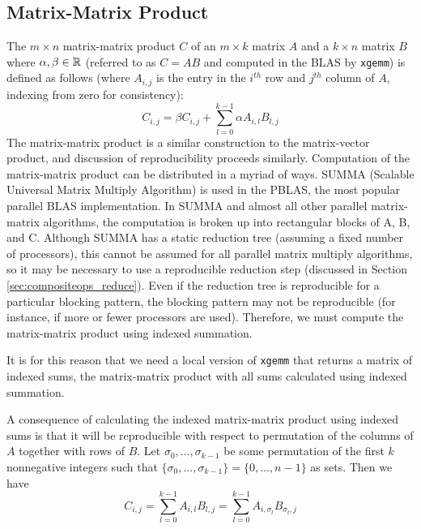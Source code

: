 \subsection{Matrix-Matrix Product}
  \label{sec:compositeops_gemm}
  The $m \times n$ matrix-matrix product $C$ of an $m \times k$ matrix $A$ and a $k \times n$ matrix $B$ where $\alpha, \beta \in \mathbb{R}$ (referred to as $C = AB$ and computed in the BLAS by \texttt{xgemm}) is defined as follows (where $A_{i, j}$ is the entry in the $i^{th}$ row and $j^{th}$ column of $A$, indexing from zero for consistency):
  \[
    C_{i, j} = \beta C_{i, j} + \sum\limits_{l = 0}^{k - 1} \alpha A_{i, l}B_{l, j}
  \]
  The matrix-matrix product is a similar construction to the matrix-vector product, and discussion of reproducibility proceeds similarly.
  Computation of the matrix-matrix product can be distributed in a myriad of ways. SUMMA (Scalable Universal Matrix Multiply Algorithm) \cite{SUMMA} is used in the PBLAS, the most popular parallel BLAS implementation. In SUMMA and almost all other parallel matrix-matrix algorithms, the computation is broken up into rectangular blocks of A, B, and C. Although SUMMA has a static reduction tree (assuming a fixed number of processors), this cannot be assumed for all parallel matrix multiply algorithms, so it may be necessary to use a reproducible reduction step (discussed in Section \ref{sec:compositeops_reduce}).
  Even if the reduction tree is reproducible for a particular blocking pattern, the blocking pattern may not be reproducible (for instance, if more or fewer processors are used). Therefore, we must compute the matrix-matrix product using indexed summation.

  It is for this reason that we need a local version of \texttt{xgemm} that returns a matrix of indexed sums, the matrix-matrix product with all sums calculated using indexed summation.

  A consequence of calculating the indexed matrix-matrix product using indexed sums is that it will be reproducible with respect to permutation of the columns of $A$ together with rows of $B$.
  Let $\sigma_0, ..., \sigma_{k - 1}$ be some permutation of the first $k$ nonnegative integers such that $\{\sigma_0, ..., \sigma_{k - 1}\} = \{0, ..., n - 1\}$ as sets. Then we have
  \begin{equation}
    C_{i, j} = \sum\limits_{l = 0}^{k - 1} A_{i, l}B_{l, j} = \sum\limits_{l = 0}^{k - 1} A_{i, \sigma_l}B_{\sigma_l, j}
    \label{eq:gemmpermute}
  \end{equation}

